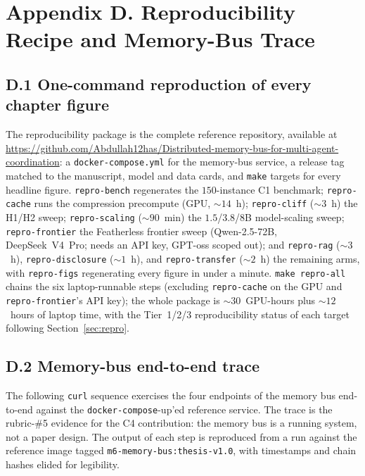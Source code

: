 \section{Appendix D. Reproducibility Recipe and Memory-Bus Trace}

\subsection{D.1 One-command reproduction of every chapter figure}

The reproducibility package is the complete reference repository,
available at
\url{https://github.com/Abdullah12has/Distributed-memory-bus-for-multi-agent-coordination}:
a \texttt{docker-compose.yml} for the memory-bus service, a release tag
matched to the manuscript, model and data cards, and \texttt{make}
targets for every headline figure. \texttt{repro-bench} regenerates
the $150$-instance C1 benchmark; \texttt{repro-cache} runs the
compression precompute (GPU, $\sim14$~h); \texttt{repro-cliff}
($\sim3$~h) the H1/H2 sweep; \texttt{repro-scaling} ($\sim90$~min) the
$1.5$/$3.8$/$8$B model-scaling sweep; \texttt{repro-frontier} the
Featherless frontier sweep (Qwen-2.5-72B, DeepSeek~V4~Pro; needs an
API key, GPT-oss scoped out); and \texttt{repro-rag} ($\sim3$~h),
\texttt{repro-disclosure} ($\sim1$~h), and \texttt{repro-transfer}
($\sim2$~h) the remaining arms, with \texttt{repro-figs} regenerating
every figure in under a minute. \texttt{make repro-all} chains the
six laptop-runnable steps (excluding \texttt{repro-cache} on the GPU
and \texttt{repro-frontier}'s API key); the whole package is
$\sim30$~GPU-hours plus $\sim12$~hours of laptop time, with the
Tier~1/2/3 reproducibility status of each target following
Section~\ref{sec:repro}.

\subsection{D.2 Memory-bus end-to-end trace}

The following \texttt{curl} sequence exercises the four
endpoints of the memory bus end-to-end against the
\texttt{docker-compose}-up'ed reference service. The trace is
the rubric-\#5 evidence for the C4 contribution: the memory bus
is a running system, not a paper design. The output of each step
is reproduced from a run against the reference image
tagged \texttt{m6-memory-bus:thesis-v1.0}, with timestamps and chain
hashes elided for legibility.

